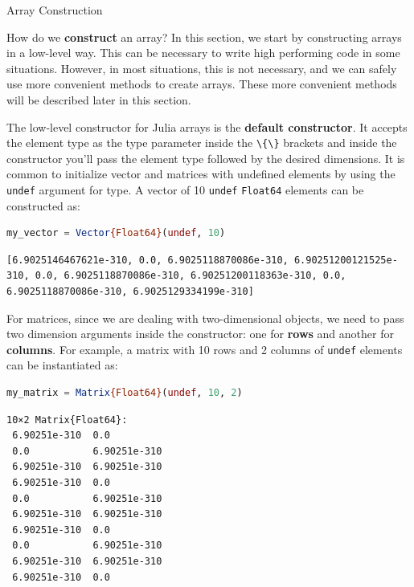\documentclass[
  notoc %
]{tufte-book}
\makeatletter
\newcommand{\passthrough}[1]{#1}
\renewcommand\subsubsection{%
\@startsection{subsubsection}{3}{\z@ }{-3.25ex\@plus -1ex \@minus -.2ex}{1.5ex \@plus .2ex}{\normalfont \normalsize \bfseries }
}
\makeatother
\begin{document}
\hypertarget{sec:array_construction}{%
\subsubsection{Array Construction}\label{sec:array_construction}}

How do we \textbf{construct} an array? In this section, we start by
constructing arrays in a low-level way. This can be necessary to write
high performing code in some situations. However, in most situations,
this is not necessary, and we can safely use more convenient methods to
create arrays. These more convenient methods will be described later in
this section.

The low-level constructor for Julia arrays is the \textbf{default
constructor}. It accepts the element type as the type parameter inside
the \passthrough{\lstinline!\{\}!} brackets and inside the constructor
you'll pass the element type followed by the desired dimensions. It is
common to initialize vector and matrices with undefined elements by
using the \passthrough{\lstinline!undef!} argument for type. A vector of
10 \passthrough{\lstinline!undef!} \passthrough{\lstinline!Float64!}
elements can be constructed as:

\begin{lstlisting}[language=Julia]
my_vector = Vector{Float64}(undef, 10)
\end{lstlisting}

\begin{lstlisting}[language=Output]
[6.9025146467621e-310, 0.0, 6.9025118870086e-310, 6.90251200121525e-310, 0.0, 6.9025118870086e-310, 6.90251200118363e-310, 0.0, 6.9025118870086e-310, 6.9025129334199e-310]
\end{lstlisting}

For matrices, since we are dealing with two-dimensional objects, we need
to pass two dimension arguments inside the constructor: one for
\textbf{rows} and another for \textbf{columns}. For example, a matrix
with 10 rows and 2 columns of \passthrough{\lstinline!undef!} elements
can be instantiated as:

\begin{lstlisting}[language=Julia]
my_matrix = Matrix{Float64}(undef, 10, 2)
\end{lstlisting}

\begin{lstlisting}[language=Output]
10×2 Matrix{Float64}:
 6.90251e-310  0.0
 0.0           6.90251e-310
 6.90251e-310  6.90251e-310
 6.90251e-310  0.0
 0.0           6.90251e-310
 6.90251e-310  6.90251e-310
 6.90251e-310  0.0
 0.0           6.90251e-310
 6.90251e-310  6.90251e-310
 6.90251e-310  0.0
\end{lstlisting}
\end{document}
